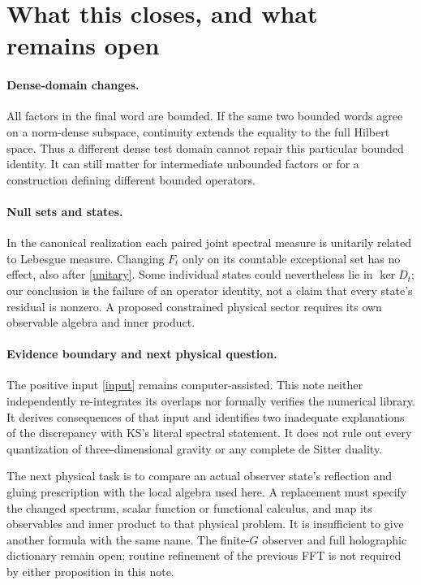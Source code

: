 \documentclass[11pt,a4paper]{article}
\begin{document}
\newpage
\section{What this closes, and what remains open}
\paragraph{Dense-domain changes.}
All factors in the final word are bounded. If the same two bounded
words agree on a norm-dense subspace, continuity extends the equality
to the full Hilbert space. Thus a different dense test domain cannot
repair this particular bounded identity. It can still matter for
intermediate unbounded factors or for a construction defining
different bounded operators.

\paragraph{Null sets and states.}
In the canonical realization each paired joint spectral measure is
unitarily related to Lebesgue measure. Changing $F_t$ only on its
countable exceptional set has no effect, also after \eqref{unitary}.
Some individual states could nevertheless lie in $\ker D_t$; our
conclusion is the failure of an operator identity, not a claim that
every state's residual is nonzero. A proposed constrained physical
sector requires its own observable algebra and inner product.

\paragraph{Evidence boundary and next physical question.}
The positive input \eqref{input} remains computer-assisted. This note
neither independently re-integrates its overlaps nor formally verifies
the numerical library. It derives consequences of that input and
identifies two inadequate explanations of the discrepancy with KS's
literal spectral statement. It does not rule out every quantization of
three-dimensional gravity or any complete de Sitter duality.

The next physical task is to compare an actual observer state's
reflection and gluing prescription with the local algebra used here.
A replacement must specify the changed spectrum, scalar function or
functional calculus, and map its observables and inner product to that
physical problem. It is insufficient to give another formula with the
same name. The finite-$G$ observer and full holographic dictionary
remain open; routine refinement of the previous FFT is not required
by either proposition in this note.
\end{document}
